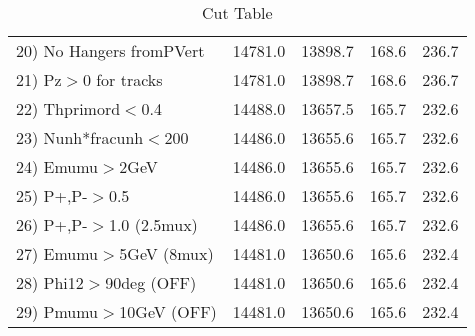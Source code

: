 \begin{table}[h!]
\begin{tabular}{||l||r|r|r|r||}
 20) No Hangers fromPVert &     14781.0 &     13898.7 &       168.6 &       236.7 \\
 21) Pz$>$0 for tracks    &     14781.0 &     13898.7 &       168.6 &       236.7 \\
 22) Thprimord$<$0.4      &     14488.0 &     13657.5 &       165.7 &       232.6 \\
 23) Nunh*fracunh$<$200   &     14486.0 &     13655.6 &       165.7 &       232.6 \\
 24) Emumu$>$2GeV         &     14486.0 &     13655.6 &       165.7 &       232.6 \\
 25) P+,P-$>$0.5          &     14486.0 &     13655.6 &       165.7 &       232.6 \\
 26) P+,P-$>$1.0 (2.5mux) &     14486.0 &     13655.6 &       165.7 &       232.6 \\
 27) Emumu$>$5GeV  (8mux) &     14481.0 &     13650.6 &       165.6 &       232.4 \\
 28) Phi12$>$90deg  (OFF) &     14481.0 &     13650.6 &       165.6 &       232.4 \\
 29) Pmumu$>$10GeV  (OFF) &     14481.0 &     13650.6 &       165.6 &       232.4 \\
 \hline
 \hline
 \end{tabular}
 \caption{Cut Table \cohpip }
 \label{tab-cut_copip}
 \end{table}
